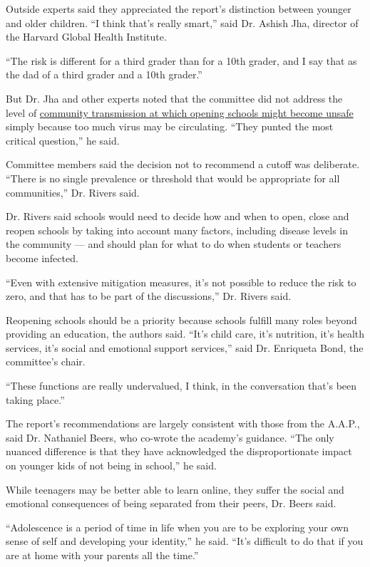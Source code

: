 Outside experts said they appreciated the report's distinction between
younger and older children. ``I think that's really smart,'' said Dr.
Ashish Jha, director of the Harvard Global Health Institute.

``The risk is different for a third grader than for a 10th grader, and I
say that as the dad of a third grader and a 10th grader.''

But Dr. Jha and other experts noted that the committee did not address
the level of
\href{https://www.nytimes3xbfgragh.onion/2020/07/14/us/coronavirus-schools-fall.html}{community
transmission at which opening schools might become unsafe} simply
because too much virus may be circulating. ``They punted the most
critical question,'' he said.

Committee members said the decision not to recommend a cutoff was
deliberate. ``There is no single prevalence or threshold that would be
appropriate for all communities,'' Dr. Rivers said.

Dr. Rivers said schools would need to decide how and when to open, close
and reopen schools by taking into account many factors, including
disease levels in the community --- and should plan for what to do when
students or teachers become infected.

``Even with extensive mitigation measures, it's not possible to reduce
the risk to zero, and that has to be part of the discussions,'' Dr.
Rivers said.

Reopening schools should be a priority because schools fulfill many
roles beyond providing an education, the authors said. ``It's child
care, it's nutrition, it's health services, it's social and emotional
support services,'' said Dr. Enriqueta Bond, the committee's chair.

``These functions are really undervalued, I think, in the conversation
that's been taking place.''

The report's recommendations are largely consistent with those from the
A.A.P., said Dr. Nathaniel Beers, who co-wrote the academy's guidance.
``The only nuanced difference is that they have acknowledged the
disproportionate impact on younger kids of not being in school,'' he
said.

While teenagers may be better able to learn online, they suffer the
social and emotional consequences of being separated from their peers,
Dr. Beers said.

``Adolescence is a period of time in life when you are to be exploring
your own sense of self and developing your identity,'' he said. ``It's
difficult to do that if you are at home with your parents all the
time.''

